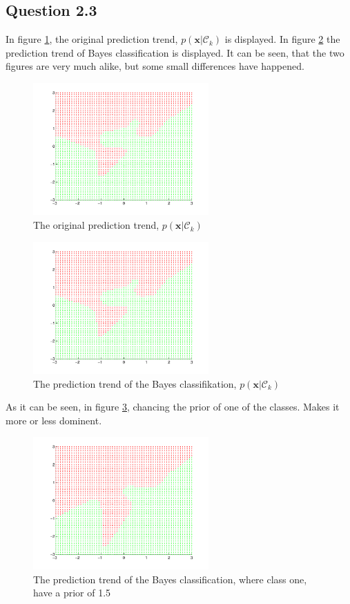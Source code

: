 \subsection*{Question 2.3}

In figure \ref{fig:q23a}, the original prediction trend,
$p(\mathbf{x}|\mathcal{C}_k)$ is displayed. In figure \ref{fig:q23b}
the prediction trend of Bayes classification is displayed. It can be
seen, that the two figures are very much alike, but some small
differences have happened.

\begin{figure}[!htbp]
  \centering
  \includegraphics[width=0.6\textwidth]{./images/q23a.pdf}
  \caption{The original prediction trend, $p(\mathbf{x}|\mathcal{C}_k)$}
  \label{fig:q23a}
\end{figure}

\begin{figure}[!htbp]
  \centering
  \includegraphics[width=0.6\textwidth]{./images/q23b.pdf}
  \caption{The prediction trend of the Bayes classifikation, $p(\mathbf{x}|\mathcal{C}_k)$}
  \label{fig:q23b}
\end{figure}

As it can be seen, in figure \ref{fig:q23c}, chancing the prior of one of
the classes. Makes it more or less dominent.

\begin{figure}[!htbp]
  \centering
  \includegraphics[width=0.6\textwidth]{./images/q23c.pdf}
  \caption{The prediction trend of the Bayes classification, where class one, have a prior of 1.5}
  \label{fig:q23c}
\end{figure}

\newpage
